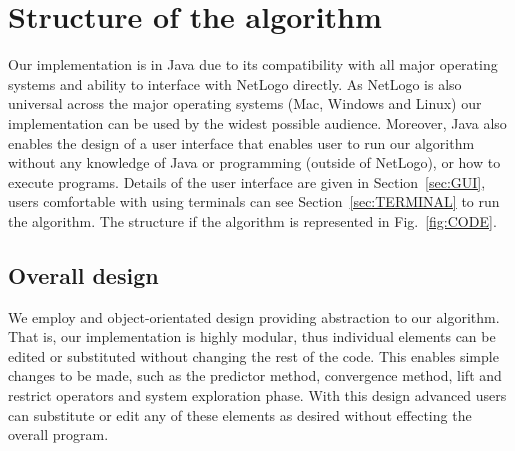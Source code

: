 \documentclass[11pt]{article}
\begin{document}
 
\section{Structure of the algorithm}
\label{sec:CODE}
Our implementation is in Java due to its compatibility with all major operating systems and ability to interface with NetLogo directly. As NetLogo is also universal across the major operating systems (Mac, Windows and Linux) our implementation can be used by the widest possible audience. Moreover, Java also enables the design of a user interface that enables user to run our algorithm without any knowledge of Java or programming (outside of NetLogo), or how to execute programs. Details of the user interface are given in Section~\ref{sec:GUI}, users comfortable with using terminals can see Section~\ref{sec:TERMINAL} to run the algorithm. The structure if the algorithm is represented in Fig.~\ref{fig:CODE}.

\subsection{Overall design}
We employ and object-orientated design providing abstraction to our algorithm. That is, our implementation is highly modular, thus individual elements can be edited or substituted without changing the rest of the code. This enables simple changes to be made, such as the predictor method, convergence method, lift and restrict operators and system exploration phase. With this design advanced users can substitute or edit any of these elements as desired without effecting the overall program. 
\end{document}

